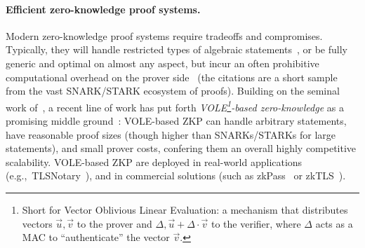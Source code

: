 \paragraph{Efficient zero-knowledge proof systems.} Modern zero-knowledge proof systems require tradeoffs and compromises. Typically, they will handle restricted types of algebraic statements~\cite{C:Schnorr89,EC:GroSah08}, or be fully generic and optimal on almost any aspect, but incur an often prohibitive computational overhead on the prover side~\cite{EC:BCCGP16,EC:Groth16,CCS:AHIV17,SP:BBBPWM18,ICALP:BBHR18,EC:BCRSVW19,CCS:MBKM19,C:Setty20,EC:CBBZ23} (the citations are a short sample from the vast SNARK/STARK ecosystem of proofs). Building on the seminal work of~\cite{STOC:IKOS07}, a recent line of work has put forth \emph{VOLE\footnote{Short for Vector Oblivious Linear Evaluation: a mechanism that distributes vectors $\vec u, \vec v$ to the prover and $\Delta, \vec u+\Delta\cdot \vec v$ to the verifier, where $\Delta$ acts as a MAC to ``authenticate'' the vector $\vec v$.}-based zero-knowledge} as a promising middle ground~\cite{CCS:BCGI18,SP:WYKW21,ITC:DitIshOst21,CCS:YSWW21,C:BMRS21}: VOLE-based ZKP can handle arbitrary statements, have reasonable proof sizes (though higher than SNARKs/STARKs for large statements), and small prover costs, confering them an overall highly competitive scalability. VOLE-based ZKP are deployed in real-world applications (e.g.,\ TLSNotary~\cite{tlsnotary}), and in commercial solutions (such as {\sf zkPass}~\cite{zkpass} or {\sf zkTLS}~\cite{primus}).

